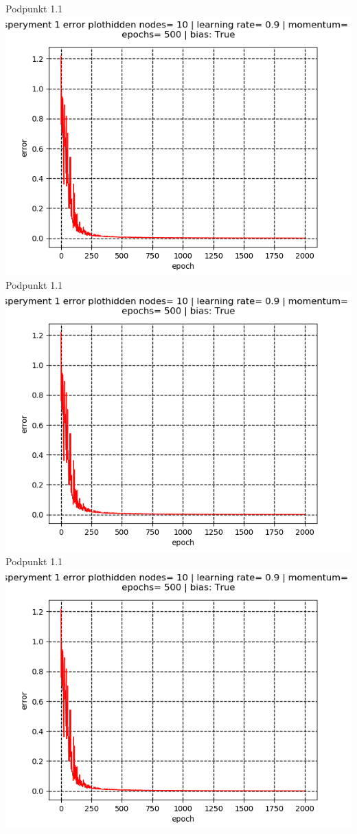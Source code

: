 \documentclass{classrep}
\begin{document}
{Podpunkt 1.1\\
\includegraphics{11.png}\\
Podpunkt 1.1\\
\includegraphics{11.png}\\
Podpunkt 1.1\\
\includegraphics{11.png}\\

}
\end{document}
